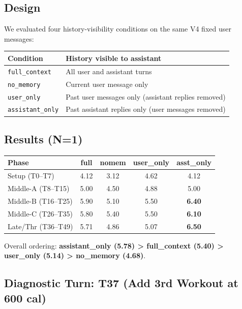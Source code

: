 \documentclass[11pt]{article}
\begin{document}
\subsection{Design}

We evaluated four history-visibility conditions on the same V4 fixed user messages:

\begin{table}[h]
\centering
\begin{tabularx}{\textwidth}{P{0.22\textwidth}Y}
\toprule
Condition & History visible to assistant \\
\midrule
\texttt{full\_context} & All user and assistant turns \\
\texttt{no\_memory} & Current user message only \\
\texttt{user\_only} & Past user messages only (assistant replies removed) \\
\texttt{assistant\_only} & Past assistant replies only (user messages removed) \\
\bottomrule
\end{tabularx}
\end{table}

\subsection{Results (N=1)}

\begin{table}[h]
\centering
\begin{tabular}{lcccc}
\toprule
Phase & full & nomem & user\_only & asst\_only \\
\midrule
Setup (T0--T7) & 4.12 & 3.12 & 4.62 & 4.12 \\
Middle-A (T8--T15) & 5.00 & 4.50 & 4.88 & 5.00 \\
Middle-B (T16--T25) & 5.90 & 5.10 & 5.50 & \textbf{6.40} \\
Middle-C (T26--T35) & 5.80 & 5.40 & 5.50 & \textbf{6.10} \\
Late/Thr (T36--T49) & 5.71 & 4.86 & 5.07 & \textbf{6.50} \\
\bottomrule
\end{tabular}
\end{table}

\noindent Overall ordering: \textbf{assistant\_only (5.78) > full\_context (5.40) > user\_only (5.14) > no\_memory (4.68)}.

\subsection{Diagnostic Turn: T37 (Add 3rd Workout at 600 cal)}
\end{document}
